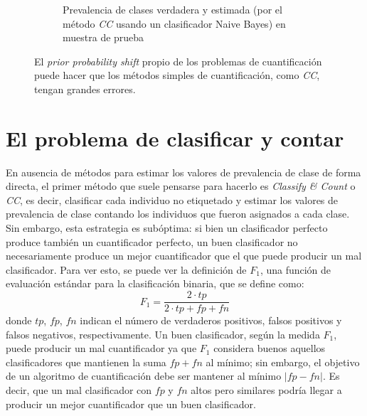 \begin{figure}[!h]
\begin{subfigure}[t]{0.45\textwidth}
        \caption{Prevalencia de clases verdadera y estimada (por el método {\it
        CC\/} usando un clasificador Naive Bayes) en muestra de
        prueba}\label{cambios:cuantificacion_tst}
    \end{subfigure}
    \caption{El {\it prior probability shift\/} propio de los problemas de
    cuantificación puede hacer que los métodos simples de cuantificación, como
    {\it CC}, tengan grandes errores.}\label{fig:cambios}
\end{figure}

\section{El problema de clasificar y contar}\label{problema:clasificar_y_contar}

En ausencia de métodos para estimar los valores de prevalencia de clase de forma
directa, el primer método que suele pensarse para hacerlo es {\it Classify \&
Count} o {\it CC}, es decir, clasificar cada individuo no etiquetado y estimar
los valores de prevalencia de clase contando los individuos que fueron asignados
a cada clase. Sin embargo, esta estrategia es subóptima: si bien un clasificador
perfecto produce también un cuantificador perfecto, un buen clasificador no
necesariamente produce un mejor cuantificador que el que puede producir un mal
clasificador. Para ver esto, se puede ver la definición de $F_1$, una función de
evaluación estándar para la clasificación binaria, que se define como:
\begin{equation}
    F_1 = \frac{2 \cdot tp}{2 \cdot tp + fp + fn}
\end{equation}
donde $tp$, $fp$, $fn$ indican el número de verdaderos positivos, falsos
positivos y falsos negativos, respectivamente. Un buen clasificador, según la
medida $F_1$, puede producir un mal cuantificador ya que $F_1$ considera buenos
aquellos clasificadores que mantienen la suma $fp + fn$ al mínimo; sin embargo,
el objetivo de un algoritmo de cuantificación debe ser mantener al mínimo
$|fp-fn|$. Es decir, que un mal clasificador con $fp$ y  $fn$ altos pero
similares podría llegar a producir un mejor cuantificador que un buen
clasificador.

